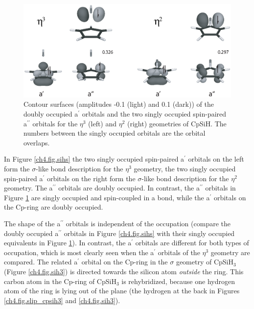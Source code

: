 \begin{figure} [htbp]
\begin{center}
\includegraphics[scale=0.67]{cyclopentadienyl/figures/sih_pi.eps}
\end{center}
\caption{Contour surfaces (amplitudes -0.1 (light) and 0.1 (dark)) of the doubly occupied a$^{\prime}$ orbitals and the two singly occupied spin-paired a$^{\prime\prime}$ orbitals for the $\eta^{3}$ (left) and $\eta^{2}$ (right) geometries of CpSiH. The numbers between the singly occupied orbitals are the orbital overlaps.}
\label{ch4.fig.sihp}
\end{figure}

In Figure \ref{ch4.fig.sihs} the two singly occupied spin-paired a$^\prime$ orbitals on the left form the $\sigma$-like bond description for the $\eta^3$ geometry, the two singly occupied spin-paired a$^\prime$ orbitals on the right form the $\sigma$-like bond description for the $\eta^2$ geometry. The a$^{\prime\prime}$ orbitals are doubly occupied. In contrast, the a$^{\prime\prime}$ orbitals in Figure \ref{ch4.fig.sihp} are singly occupied and spin-coupled in a bond, while the a$^\prime$ orbitals on the Cp-ring are doubly occupied.

The shape of the a$^{\prime\prime}$ orbitals is independent of the occupation (compare the doubly occupied a$^{\prime\prime}$ orbitals in Figure \ref{ch4.fig.sihs} with their  singly occupied equivalents in Figure \ref{ch4.fig.sihp}). In contrast, the a$^\prime$ orbitals are different for both types of occupation, which is most clearly seen when the a$^\prime$ orbitals of the $\eta^3$ geometry are compared. The related a$^\prime$ orbital on the Cp-ring in the $\sigma$ geometry of CpSiH$_3$ (Figure \ref{ch4.fig.sih3}) is directed towards the silicon atom \textit{outside} the ring. This carbon atom in the Cp-ring of CpSiH$_3$ is rehybridized, because one hydrogen atom of the ring is lying out of the plane (the hydrogen at the back in Figures \ref{ch4.fig.slip_cpsih3} and \ref{ch4.fig.sih3}).

